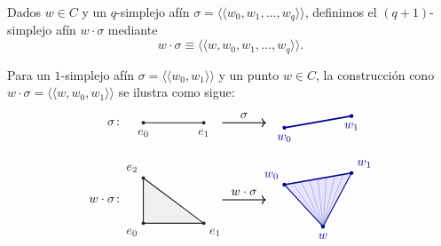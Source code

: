 \begin{definicion}
Dados $w \in C$ y un $q$-simplejo afín $\sigma = \langle\!\langle w_0, w_1, \dots, w_q \rangle\!\rangle$, definimos el $(q+1)$-simplejo afín $w \cdot \sigma$ mediante
\[
w \cdot \sigma \equiv \langle\!\langle w, w_0, w_1, \dots, w_q \rangle\!\rangle.
\]
\end{definicion}
\begin{ejemplo}
Para un $1$-simplejo afín $\sigma = \langle\!\langle w_0, w_1 \rangle\!\rangle$ y un punto $w \in C$, la construcción cono $w \cdot \sigma = \langle\!\langle w, w_0, w_1 \rangle\!\rangle$ se ilustra como sigue:
\[
\begin{tikzpicture}[baseline=(current bounding box.center), scale=0.95]
    \node[left] at (-0.45, 3.0) {$\sigma\colon$};

    \coordinate (A0) at (0, 3.0);
    \coordinate (A1) at (1.8, 3.0);
    \draw[thick, black!85] (A0) -- (A1);
    \fill[black!85] (A0) circle (1.5pt) node[below=2pt] {$e_0$};
    \fill[black!85] (A1) circle (1.5pt) node[below=2pt] {$e_1$};

    \draw[->, thick] (2.35, 3.0) -- (3.65, 3.0) node[midway, above] {$\sigma$};

    \coordinate (B0) at (4.2, 2.85);
    \coordinate (B1) at (6.2, 3.20);
    \draw[very thick, blue!55!black] (B0) -- (B1);
    \fill[blue!55!black] (B0) circle (1.6pt) node[below=2pt] {$w_0$};
    \fill[blue!55!black] (B1) circle (1.6pt) node[below=2pt] {$w_1$};

    \node[left] at (-0.45, 0.7) {$w \cdot \sigma\colon$};

    \coordinate (E0) at (0, 0.0);
    \coordinate (E1) at (1.8, 0.0);
    \coordinate (E2) at (0, 1.35);
    \fill[gray!12] (E0) -- (E1) -- (E2) -- cycle;
    \draw[thick, black!85] (E0) -- (E1) -- (E2) -- cycle;
    \fill[black!85] (E0) circle (1.5pt) node[below left=1pt] {$e_0$};
    \fill[black!85] (E1) circle (1.5pt) node[below right=1pt] {$e_1$};
    \fill[black!85] (E2) circle (1.5pt) node[above left=1pt] {$e_2$};

    \draw[->, thick] (2.35, 0.7) -- (3.65, 0.7) node[midway, above] {$w \cdot \sigma$};

    \coordinate (W0) at (4.2, 1.15);
    \coordinate (W1) at (6.2, 1.50);
    \coordinate (W)  at (5.35, -0.10);

    \fill[blue!10] (W) -- (W0) -- (W1) -- cycle;
    \foreach \k in {1,...,7} {
        \draw[blue!55!black!45, thin] (W) -- ({4.2 + 0.25*\k}, {1.15 + 0.04375*\k});
    }
    \draw[thick, blue!55!black] (W) -- (W0) (W) -- (W1);
    \draw[very thick, blue!55!black] (W0) -- (W1);

    \fill[blue!55!black] (W0) circle (1.6pt) node[above left=1pt] {$w_0$};
    \fill[blue!55!black] (W1) circle (1.6pt) node[above right=1pt] {$w_1$};
    \fill[blue!55!black] (W)  circle (1.6pt) node[below=2pt] {$w$};
\end{tikzpicture}
\]
\end{ejemplo}

